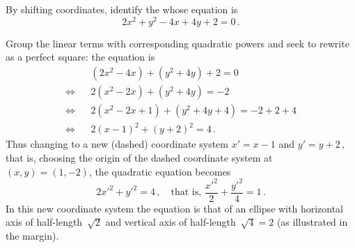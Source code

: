 \begin{example} 
By shifting coordinates, identify the  whose equation is
\begin{equation*}
2x^2+y^2-4x+4y+2=0\,.
\end{equation*}
\begin{solution} 
Group the linear terms with corresponding quadratic powers and seek to rewrite as a perfect square: the equation is
\begin{eqnarray*}&&
(2x^2-4x)+(y^2+4y)+2=0
\\\iff&&
2(x^2-2x)+(y^2+4y)=-2
\\\iff&&
2(x^2-2x+1)+(y^2+4y+4)=-2+2+4
\\\iff&&
2(x-1)^2+(y+2)^2=4\,.
\end{eqnarray*}
Thus changing to a new (dashed) coordinate system \(x'=x-1\) and \(y'=y+2\)\,, that is, choosing the origin of the dashed coordinate system at \((x,y)=(1,-2)\), the quadratic equation becomes
%
\begin{equation*}
2{x'}^2+{y'}^2=4\,, \quad\text{that is, }
\frac{{x'}^2}{2}+\frac{{y'}^2}{4}=1\,.
\end{equation*}
In this new coordinate system the equation is that of an ellipse with horizontal axis of half-length~\(\sqrt2\) and vertical axis of half-length~\(\sqrt4=2\) (as illustrated in the margin).
\end{solution}
\end{example}


